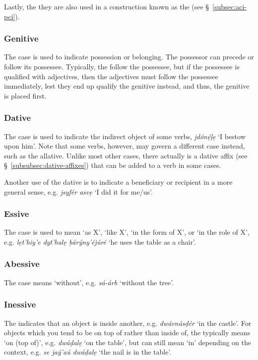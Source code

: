 \documentclass[a4paper, 12pt, twoside, final]{article}
\let \w \textit
\begin{document}
Lastly, the they are also used in a construction known as the  (see §~\ref{subsec:aci-pci}).

\subsubsection{Genitive}
The  case is used to indicate possession or belonging. The possessor can precede or follow its possessee. Typically,
the  follow the possessee, but if the possessee is qualified with adjectives, then the adjectives must follow the
possessee immediately, lest they end up qualify the genitive instead, and thus, the genitive is placed first.

\subsubsection{Dative}
The  case is used to indicate the indirect object of some verbs, \w{jdónẹ́ḷẹ} ‘I bestow upon him’. Note that some
verbs, however, may govern a different case instead, such as the allative. Unlike most other cases, there actually is
a dative affix (see §~\ref{subsubsec:dative-affixes}) that can be added to a verb in some cases.

Another use of the dative is to indicate a beneficiary or recipient in a more general sense, e.g. \w{jsyfér asvẹ} ‘I did
it for me/us’.

\subsubsection{Essive}
The  case is used to mean ‘as X’, ‘like X’, ‘in the form of X’, or ‘in the role of X’, e.g. \w{lẹt’hiy’e dyt’halẹ ḅárýny’éjúré}
‘he uses the table as a chair’.

\subsubsection{Abessive}
The  case means ‘without’, e.g. \w{sá-árb} ‘without the tree’.

\subsubsection{Inessive}
The  indicates that an object is inside another, e.g. \w{dwávnásḍér} ‘in the castle’. For objects which you tend
to be on top of rather than inside of, the  typically means ‘on (top of)’, e.g. \w{dwáḍalẹ} ‘on the table’, but
can still mean ‘in’ depending on the context, e.g. \w{se jaý’aú dwáḍalẹ} ‘the nail is in the table’.
\end{document}
